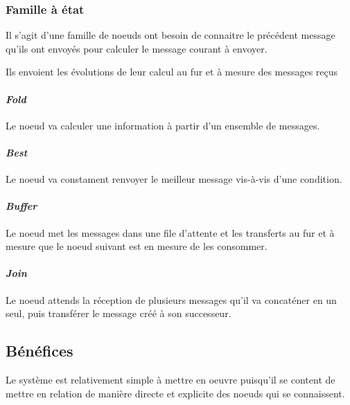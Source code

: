 \documentclass{article}
\begin{document}
\subsubsection{Famille à état}
Il s'agit d'une famille de noeuds ont besoin de connaitre le précédent message qu'ils
ont envoyés pour calculer le message courant à envoyer.

Ils envoient les évolutions de leur calcul au fur et à mesure des messages reçus

\paragraph{\emph{Fold}}
Le noeud va calculer une information à partir d'un ensemble de messages.

\paragraph{\emph{Best}}
Le noeud va constament renvoyer le meilleur message vis-à-vis d'une condition.

\paragraph{\emph{Buffer}}
Le noeud met les messages dans une file d'attente et les transferts au fur et à
mesure que le noeud suivant est en mesure de les consommer.

\paragraph{\emph{Join}}
Le noeud attends la réception de plusieurs messages qu'il va concaténer en un seul,
puis transférer le message créé à son successeur.

\subsection{Bénéfices}\label{bénéfices}
Le système est relativement simple à mettre en oeuvre puisqu'il se content de mettre
en relation de manière directe et explicite des noeuds qui se connaissent.
\end{document}
